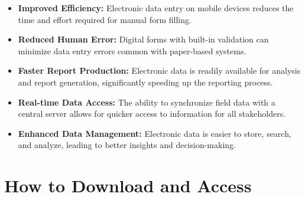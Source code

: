 \documentclass[12pt]{article}
\begin{document}
\begin{itemize}
    \item \textbf{Improved Efficiency:} Electronic data entry on mobile devices reduces the time and effort required for manual form filling.
    \item \textbf{Reduced Human Error:} Digital forms with built-in validation can minimize data entry errors common with paper-based systems.
    \item \textbf{Faster Report Production:} Electronic data is readily available for analysis and report generation, significantly speeding up the reporting process.
    \item \textbf{Real-time Data Access:} The ability to synchronize field data with a central server allows for quicker access to information for all stakeholders.
    \item \textbf{Enhanced Data Management:} Electronic data is easier to store, search, and analyze, leading to better insights and decision-making.
\end{itemize}

\newpage

\section*{How to Download and Access}
\newpage
\end{document}
